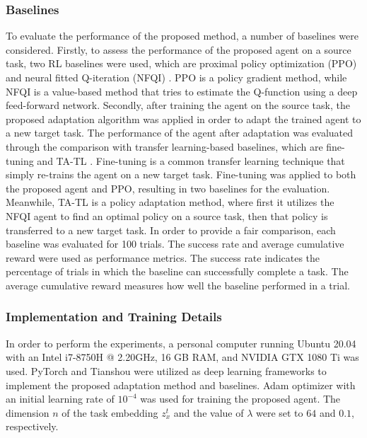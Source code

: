 \subsubsection{Baselines}


To evaluate the performance of the proposed method,
a number of baselines were considered.
Firstly,
to assess the performance of the proposed agent on a source task,
two RL baselines were used, which are proximal policy optimization (PPO) \cite{Baseline_PPO} and neural fitted Q-iteration (NFQI) \cite{Baseline_NFQI}.
PPO is a policy gradient method,
while NFQI is a value-based method that tries to estimate the Q-function using a deep feed-forward network.
Secondly,
after training the agent on the source task,
the proposed adaptation algorithm was applied in order to adapt the trained agent to a new target task.
The performance of the agent after adaptation was evaluated through the comparison with transfer learning-based baselines, which are fine-tuning and TA-TL \cite{Baseline_TATL}.
Fine-tuning is a common transfer learning technique that simply re-trains the agent on a new target task.
Fine-tuning was applied to both the proposed agent and PPO,
resulting in two baselines for the evaluation.
Meanwhile,
TA-TL is a policy adaptation method, where first it utilizes the NFQI agent to find an optimal policy on a source task,
then that policy is transferred to a new target task.
In order to provide a fair comparison,
each baseline was evaluated for 100 trials.
The success rate and average cumulative reward were used as performance metrics.
The success rate indicates the percentage of trials in which the baseline can successfully complete a task.
The average cumulative reward measures how well the baseline performed in a trial.


\subsubsection{Implementation and Training Details}


In order to perform the experiments,
a personal computer running Ubuntu 20.04 with an Intel i7-8750H @ 2.20GHz,
16 GB RAM,
and NVIDIA GTX 1080 Ti was used.
PyTorch \cite{DL_Lib_PyTorch} and Tianshou \cite{DL_Lib_Tianshou} were utilized as deep learning frameworks to implement the proposed adaptation method and baselines.
Adam optimizer with an initial learning rate of $10^{-4}$ was used for training the proposed agent.
The dimension $n$ of the task embedding $z^t_x$ and the value of $\lambda$ were set to $64$ and $0.1$, respectively.


